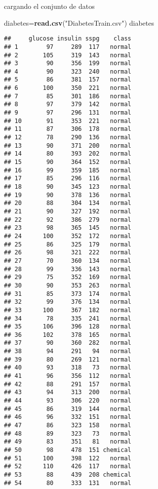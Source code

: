 \documentclass[ignorenonframetext,]{beamer}
\newenvironment{Shaded}{\begin{snugshade}}{\end{snugshade}}
\newcommand{\KeywordTok}[1]{\textcolor[rgb]{0.13,0.29,0.53}{\textbf{#1}}}
\newcommand{\StringTok}[1]{\textcolor[rgb]{0.31,0.60,0.02}{#1}}
\newcommand{\NormalTok}[1]{#1}
\begin{document}
\begin{frame}[fragile]{cargando el conjunto de datos}

\begin{Shaded}
\begin{Highlighting}[]
\NormalTok{diabetes=}\KeywordTok{read.csv}\NormalTok{(}\StringTok{"DiabetesTrain.csv"}\NormalTok{)}
\NormalTok{diabetes}
\end{Highlighting}
\end{Shaded}

\begin{verbatim}
##     glucose insulin sspg    class
## 1        97     289  117   normal
## 2       105     319  143   normal
## 3        90     356  199   normal
## 4        90     323  240   normal
## 5        86     381  157   normal
## 6       100     350  221   normal
## 7        85     301  186   normal
## 8        97     379  142   normal
## 9        97     296  131   normal
## 10       91     353  221   normal
## 11       87     306  178   normal
## 12       78     290  136   normal
## 13       90     371  200   normal
## 14       80     393  202   normal
## 15       90     364  152   normal
## 16       99     359  185   normal
## 17       85     296  116   normal
## 18       90     345  123   normal
## 19       90     378  136   normal
## 20       88     304  134   normal
## 21       90     327  192   normal
## 22       92     386  279   normal
## 23       98     365  145   normal
## 24      100     352  172   normal
## 25       86     325  179   normal
## 26       98     321  222   normal
## 27       70     360  134   normal
## 28       99     336  143   normal
## 29       75     352  169   normal
## 30       90     353  263   normal
## 31       85     373  174   normal
## 32       99     376  134   normal
## 33      100     367  182   normal
## 34       78     335  241   normal
## 35      106     396  128   normal
## 36      102     378  165   normal
## 37       90     360  282   normal
## 38       94     291   94   normal
## 39       80     269  121   normal
## 40       93     318   73   normal
## 41       96     356  112   normal
## 42       88     291  157   normal
## 43       94     313  200   normal
## 44       93     306  220   normal
## 45       86     319  144   normal
## 46       96     332  151   normal
## 47       86     323  158   normal
## 48       89     323   73   normal
## 49       83     351   81   normal
## 50       98     478  151 chemical
## 51      100     398  122   normal
## 52      110     426  117   normal
## 53       88     439  208 chemical
## 54       80     333  131   normal

\end{verbatim}
\end{frame}
\end{document}
